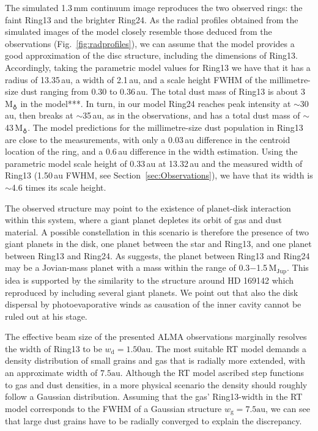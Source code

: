 \documentclass[letters,usenatbib,times]{mnras}
\begin{document}
The simulated 1.3\,mm continuum image reproduces the two observed rings: the faint Ring13 and the brighter Ring24. As the radial profiles obtained from the simulated images of the model closely resemble those deduced from the observations (Fig.~\ref{fig:radprofiles}), we can assume that the model provides a good approximation of the disc structure, including the dimensions of Ring13. Accordingly, taking the parametric model values for Ring13 we have that it has a radius of 13.35\,au, a width of 2.1\,au, and a scale height FWHM of the millimetre-size dust ranging from 0.30 to 0.36\,au. The total dust mass of Ring13 is about 3\,M$_{\earth}$ in the model***. In turn, in our model Ring24 reaches peak intensity at $\sim$30\,au, then breaks at $\sim$35\,au, as in the observations, and has a total dust mass of $\sim$43\,M$_{\earth}$. The model predictions for the millimetre-size dust population in Ring13 are close to the measurements, with only a 0.03\,au difference in the centroid location of the ring, and a 0.6\,au difference in the width estimation.
Using the parametric model scale height of 0.33\,au at 13.32\,au and the measured width of Ring13 (1.50\,au FWHM, see Section~\ref{sec:Observations}), we have that its width is $\sim$4.6 times its scale height.

The observed structure may point to the existence of planet-disk interaction within this system, where a giant planet depletes its orbit of gas and dust material. A possible constellation in this scenario is therefore the presence of two giant planets in the disk, one planet between the star and Ring13, and one planet between Ring13 and Ring24. As \citet{Ru_z_Rodr_guez_2019} suggests, the planet between Ring13 and Ring24 may be a Jovian-mass planet with a mass within the range of 0.3$-$1.5\,$\mathrm{M}_{\mathrm{Jup}}$. This idea is supported by the similarity to the structure around HD 169142 which \citet{bertrang_avenhaus_2018} reproduced by including several giant planets. We point out that also the disk dispersal by photoevaporative winds \citep{1994ApJ...428..654H} as causation of the inner cavity cannot be ruled out at his stage.

The effective beam size of the presented ALMA observations marginally resolves the width of Ring13 to be $w_\mathrm{d} = 1.50\mathrm{au}$. The most suitable RT model demands a density distribution of small grains and gas that is radially more extended, with an approximate width of $7.5\mathrm{au}$. Although the RT model ascribed step functions to gas and dust densities, in a more physical scenario the density should roughly follow a Gaussian distribution. Assuming that the gas' Ring13-width in the RT model corresponds to the FWHM of a Gaussian structure $w_\mathrm{g} = 7.5\mathrm{au}$, we can see that large dust grains have to be radially converged to explain the discrepancy.
\end{document}
